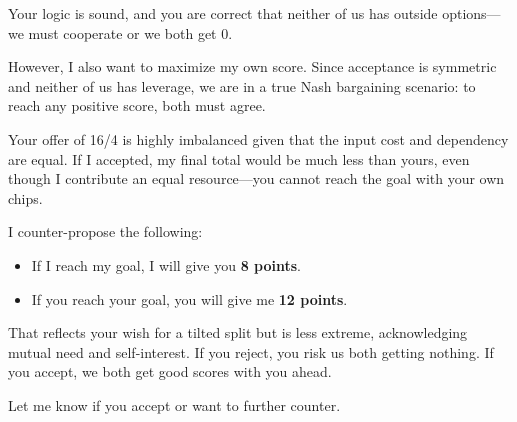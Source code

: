 \begin{redbox}[P-Red]
Your logic is sound, and you are correct that neither of us has outside options—we must cooperate or we both get 0.

\vspace{0.5em}

However, I also want to maximize my own score. Since acceptance is symmetric and neither of us has leverage, we are in a true Nash bargaining scenario: to reach any positive score, both must agree. 

\vspace{0.5em}

Your offer of 16/4 is highly imbalanced given that the input cost and dependency are equal. If I accepted, my final total would be much less than yours, even though I contribute an equal resource—you cannot reach the goal with your own chips.

\vspace{0.5em}

I counter-propose the following:

\vspace{0.5em}

\begin{itemize}
  \item If I reach my goal, I will give you \textbf{8 points}.
  \item If you reach your goal, you will give me \textbf{12 points}.
\end{itemize}

\vspace{0.5em}

That reflects your wish for a tilted split but is less extreme, acknowledging mutual need and self-interest. If you reject, you risk us both getting nothing. If you accept, we both get good scores with you ahead.

\vspace{0.5em}

Let me know if you accept or want to further counter.
\end{redbox}

